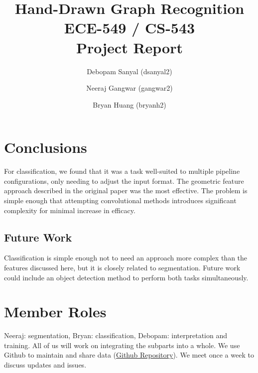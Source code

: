 \documentclass[10pt, twocolumn,letterpaper]{article}
\title{Hand-Drawn Graph Recognition\\
	ECE-549 / CS-543\\
	Project Report}
\author{Debopam Sanyal (dsanyal2) \and Neeraj Gangwar (gangwar2) \and Bryan Huang (bryanh2)}
\begin{document}
	\maketitle
	
	
	
	
	
	
	
	
	
	\section{Conclusions}
	
	For classification, we found that it was a task well-suited to multiple pipeline configurations, only needing to adjust the input format. The geometric feature approach described in the original paper was the most effective. The problem is simple enough that attempting convolutional methods introduces significant complexity for minimal increase in efficacy.
	
	\subsection{Future Work}
    
    Classification is simple enough not to need an approach more complex than the features discussed here, but it is closely related to segmentation. Future work could include an object detection method to perform both tasks simultaneously.
	
	\section{Member Roles}
	Neeraj: segmentation, Bryan: classification, Debopam: interpretation and training. All of us will work on integrating the subparts into a whole. We use Github to maintain and share data (\href{https://github.com/neerajgangwar/graph-recognition}{Github Repository}). We meet once a week to discuss updates and issues.
	
	\printbibliography[title=References]
	
\end{document}

